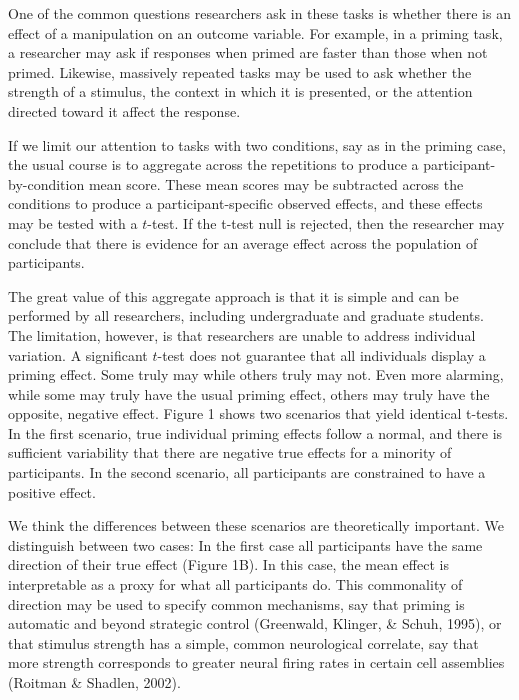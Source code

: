 \documentclass[american,man]{apa6}
\begin{document}
One of the common questions researchers ask in these tasks is whether
there is an effect of a manipulation on an outcome variable. For
example, in a priming task, a researcher may ask if responses when
primed are faster than those when not primed. Likewise, massively
repeated tasks may be used to ask whether the strength of a stimulus,
the context in which it is presented, or the attention directed toward
it affect the response.

If we limit our attention to tasks with two conditions, say as in the
priming case, the usual course is to aggregate across the repetitions to
produce a participant-by-condition mean score. These mean scores may be
subtracted across the conditions to produce a participant-specific
observed effects, and these effects may be tested with a \(t\)-test. If
the t-test null is rejected, then the researcher may conclude that there
is evidence for an average effect across the population of participants.

The great value of this aggregate approach is that it is simple and can
be performed by all researchers, including undergraduate and graduate
students. The limitation, however, is that researchers are unable to
address individual variation. A significant \(t\)-test does not
guarantee that all individuals display a priming effect. Some truly may
while others truly may not. Even more alarming, while some may truly
have the usual priming effect, others may truly have the opposite,
negative effect. Figure 1 shows two scenarios that yield identical
t-tests. In the first scenario, true individual priming effects follow a
normal, and there is sufficient variability that there are negative true
effects for a minority of participants. In the second scenario, all
participants are constrained to have a positive effect.

We think the differences between these scenarios are theoretically
important. We distinguish between two cases: In the first case all
participants have the same direction of their true effect (Figure 1B).
In this case, the mean effect is interpretable as a proxy for what all
participants do. This commonality of direction may be used to specify
common mechanisms, say that priming is automatic and beyond strategic
control (Greenwald, Klinger, \& Schuh, 1995), or that stimulus strength
has a simple, common neurological correlate, say that more strength
corresponds to greater neural firing rates in certain cell assemblies
(Roitman \& Shadlen, 2002).
\end{document}
